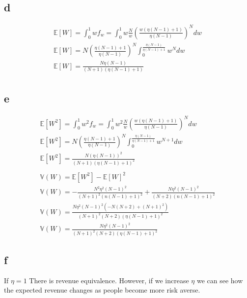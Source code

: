 \documentclass[10pt]{paper}
\begin{document}
\subsection*{d}


\begin{align*}
  \mathbb{E}[ W ] = \int_0^1 w f_w = \int_0^1 w \frac{N}{w} \left(\frac{w \left(\eta(N-1) + 1\right)}{\eta \left(N - 1\right)}\right)^{N}dw\\
  \mathbb{E}[ W ] = N \left ( \frac{\eta(N-1)+1}{\eta(N-1)} \right )^N \int_0^{\frac{\eta(N-1)}{\eta(N-1)+1}} w^Ndw\\
  \mathbb{E}[ W ] = \frac{N \eta(N-1)}{(N+1)(\eta(N-1)+1)}\\
\end{align*}


\subsection*{e}


\begin{align*}
   \mathbb{E}[ W^2 ] = \int_0^1 w^2 f_w = \int_0^1 w^2 \frac{N}{w} \left(\frac{w \left(\eta(N-1) + 1\right)}{\eta \left(N - 1\right)}\right)^{N}dw\\
  \mathbb{E}[ W^2 ] = N \left ( \frac{\eta(N-1)+1}{\eta(N-1)} \right )^N \int_0^{\frac{\eta(N-1)}{\eta(N-1)+1}} w^{N+1}dw\\
  \mathbb{E}[ W^2 ] = \frac{N (\eta(N-1))^2}{(N+1)(\eta(N-1)+1)^2}\\
  \\
  \mathbb{V}(W) = \mathbb{E}[W^2] - \mathbb{E}[W]^2\\
  \mathbb{V}(W) = - \frac{N^{2} \eta^{2} \left(N - 1\right)^{2}}{\left(N + 1\right)^{2} \left(n \left(N - 1\right) + 1\right)^{2}} + \frac{N \eta^{2} \left(N - 1\right)^{2}}{\left(N + 2\right) \left(n \left(N - 1\right) + 1\right)^{2}}\\
  \mathbb{V}(W) = \frac{N \eta^{2} \left(N - 1\right)^{2} \left(- N \left(N + 2\right) + \left(N + 1\right)^{2}\right)}{\left(N + 1\right)^{2} \left(N + 2\right) \left(\eta \left(N - 1\right) + 1\right)^{2}}\\
  \mathbb{V}(W) = \frac{N \eta^2 ( N-1 )^2}{(N+1)^2 (N+2) ( \eta(N-1) +1 )^2}
\end{align*}

\subsection*{f}
If $\eta = 1$ There is revenue equivalence. However, if we increase $\eta$
we can see how the expected revenue changes as people become more risk averse.
\end{document}
